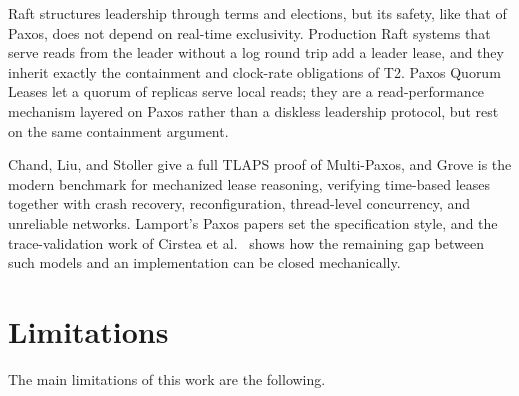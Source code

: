 \documentclass[final,5p,times,twocolumn,number]{elsarticle}
\begin{document}
Raft \cite{ref4} structures leadership through terms and elections, but its safety, like that of Paxos, does not depend on real-time exclusivity.  Production Raft systems that serve reads from the leader without a log round trip add a leader lease, and they inherit exactly the containment and clock-rate obligations of T2.  Paxos Quorum Leases \cite{ref12} let a quorum of replicas serve local reads; they are a read-performance mechanism layered on Paxos rather than a diskless leadership protocol, but rest on the same containment argument.

Chand, Liu, and Stoller \cite{ref5} give a full TLAPS proof of Multi-Paxos, and Grove \cite{ref11} is the modern benchmark for mechanized lease reasoning, verifying time-based leases together with crash recovery, reconfiguration, thread-level concurrency, and unreliable networks.  Lamport's Paxos papers \cite{ref2,ref9} set the specification style, and the trace-validation work of Cirstea et al.\ \cite{ref13} shows how the remaining gap between such models and an implementation can be closed mechanically.

\section{Limitations}\label{sec:limitations}

The main limitations of this work are the following.
\end{document}
